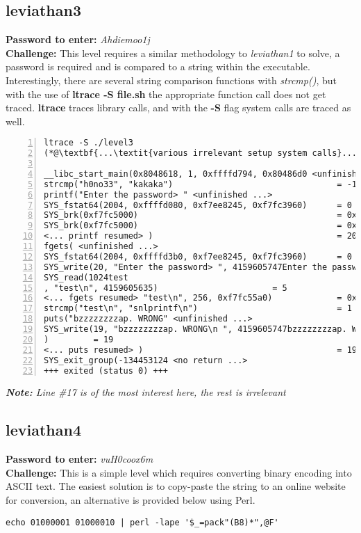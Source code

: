 \documentclass[a4paper]{article}
\newcommand{\pass}[1]{\textbf{Password to enter:} \textit{#1}\\}
\newcommand{\chall}{\textbf{Challenge:} }
\newcommand{\note}[1]{\textit{\textbf{Note:} #1}\\}
\begin{document}
\subsection*{leviathan3}
\pass{Ahdiemoo1j}
\chall This level requires a similar methodology to \textit{leviathan1} to solve, a password is required and is compared to a string within the executable.
Interestingly, there are several string comparison functions with \textit{strcmp()}, but with the use of \textbf{ltrace -S file.sh} the appropriate function call does not get traced. \textbf{ltrace} traces library calls, and with the \textbf{-S} flag system calls are traced as well.
\begin{lstlisting}[numbers=left]
ltrace -S ./level3 
(*@\textbf{...\textit{various irrelevant setup system calls}...} @*)

__libc_start_main(0x8048618, 1, 0xffffd794, 0x80486d0 <unfinished ...>
strcmp("h0no33", "kakaka")                                 = -1
printf("Enter the password> " <unfinished ...>
SYS_fstat64(2004, 0xffffd080, 0xf7ee8245, 0xf7fc3960)      = 0
SYS_brk(0xf7fc5000)                                        = 0x804b000
SYS_brk(0xf7fc5000)                                        = 0x806c000
<... printf resumed> )                                     = 20
fgets( <unfinished ...>
SYS_fstat64(2004, 0xffffd3b0, 0xf7ee8245, 0xf7fc3960)      = 0
SYS_write(20, "Enter the password> ", 4159605747Enter the password> )          = 20
SYS_read(1024test
, "test\n", 4159605635)                       = 5
<... fgets resumed> "test\n", 256, 0xf7fc55a0)             = 0xffffd5a0
strcmp("test\n", "snlprintf\n")                            = 1
puts("bzzzzzzzzap. WRONG" <unfinished ...>
SYS_write(19, "bzzzzzzzzap. WRONG\n ", 4159605747bzzzzzzzzap. WRONG
)         = 19
<... puts resumed> )                                       = 19
SYS_exit_group(-134453124 <no return ...>
+++ exited (status 0) +++
\end{lstlisting}
\note{Line \#17 is of the most interest here, the rest is irrelevant}

\subsection*{leviathan4}
\pass{vuH0coox6m}
\chall This is a simple level which requires converting binary encoding into ASCII text. The easiest solution is to copy-paste the string to an online website for conversion, an alternative is provided below using Perl.
\begin{lstlisting}[title=\href{https://unix.stackexchange.com/a/98949}{source \& explanation}]
echo 01000001 01000010 | perl -lape '$_=pack"(B8)*",@F'
\end{lstlisting}
\end{document}
